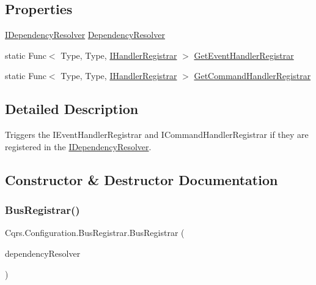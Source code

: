 \subsection*{Properties}
\begin{DoxyCompactItemize}
\item 
\hyperlink{interfaceCqrs_1_1Configuration_1_1IDependencyResolver}{I\+Dependency\+Resolver} \hyperlink{classCqrs_1_1Configuration_1_1BusRegistrar_aafccd565c2d9a748ff0f850a94100399}{Dependency\+Resolver}
\item 
static Func$<$ Type, Type, \hyperlink{interfaceCqrs_1_1Bus_1_1IHandlerRegistrar}{I\+Handler\+Registrar} $>$ \hyperlink{classCqrs_1_1Configuration_1_1BusRegistrar_adaab0236b3ce39214ce60b2272e5ab19}{Get\+Event\+Handler\+Registrar}
\item 
static Func$<$ Type, Type, \hyperlink{interfaceCqrs_1_1Bus_1_1IHandlerRegistrar}{I\+Handler\+Registrar} $>$ \hyperlink{classCqrs_1_1Configuration_1_1BusRegistrar_a5ac56d73af9d550c70ee722daed7dce8}{Get\+Command\+Handler\+Registrar}
\end{DoxyCompactItemize}


\subsection{Detailed Description}
Triggers the I\+Event\+Handler\+Registrar and I\+Command\+Handler\+Registrar if they are registered in the \hyperlink{interfaceCqrs_1_1Configuration_1_1IDependencyResolver}{I\+Dependency\+Resolver}. 



\subsection{Constructor \& Destructor Documentation}
\mbox{\label{classCqrs_1_1Configuration_1_1BusRegistrar_a4a934d21a535b28af6c67154512bba20}} 
\subsubsection{\texorpdfstring{Bus\+Registrar()}{BusRegistrar()}}
{\footnotesize\ttfamily Cqrs.\+Configuration.\+Bus\+Registrar.\+Bus\+Registrar (\begin{DoxyParamCaption}\item[{\hyperlink{interfaceCqrs_1_1Configuration_1_1IDependencyResolver}{I\+Dependency\+Resolver}}]{dependency\+Resolver }\end{DoxyParamCaption})}



